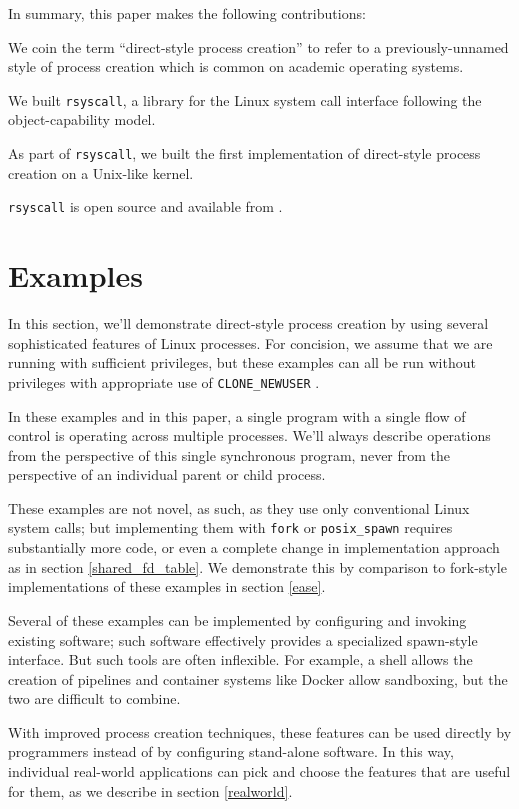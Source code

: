 \documentclass[letterpaper,twocolumn,10pt]{article}
\begin{document}
In summary, this paper makes the following contributions:
\begin{compactitem}
\item We coin the term ``direct-style process creation''
  to refer to a previously-unnamed style of process creation which is common on academic operating systems.
\item We built \texttt{rsyscall}, a library for the Linux system call interface following the object-capability model.
\item As part of \texttt{rsyscall}, we built the first implementation of direct-style process creation on a Unix-like kernel.
\end{compactitem}
\texttt{rsyscall} is open source and available from \githuburl{}.
\section{Examples}\label{examples}
In this section,
we'll demonstrate direct-style process creation
by using several sophisticated features of Linux processes.
For concision, we assume that we are running with sufficient privileges,
but these examples can all be run without privileges with appropriate use of \verb|CLONE_NEWUSER|
\cite{user_namespaces}\cite{unpriv_fuse}.

In these examples and in this paper,
a single program with a single flow of control is operating across multiple processes.
We'll always describe operations from the perspective of this single synchronous program,
never from the perspective of an individual parent or child process.

These examples are not novel, as such, as they use only conventional Linux system calls;
but implementing them with \texttt{fork} or \verb|posix_spawn| requires substantially more code,
or even a complete change in implementation approach as in section \ref{shared_fd_table}.
We demonstrate this by comparison to fork-style implementations of these examples in section \ref{ease}.

Several of these examples can be implemented by configuring and invoking existing software;
such software effectively provides a specialized spawn-style interface.
But such tools are often inflexible.
For example, a shell allows the creation of pipelines and container systems like Docker allow sandboxing,
but the two are difficult to combine\cite{docker_pipe}.

With improved process creation techniques,
these features can be used directly by programmers
instead of by configuring stand-alone software.
In this way,
individual real-world applications can pick and choose the features that are useful for them,
as we describe in section \ref{realworld}.
\end{document}
